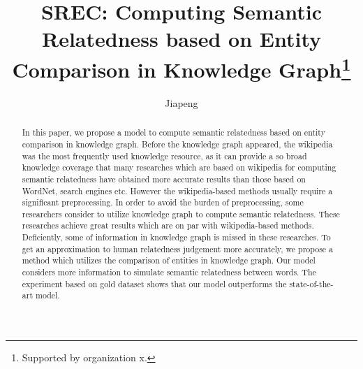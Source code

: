 \documentclass[runningheads]{llncs}
\begin{document}
  \title{SREC: Computing Semantic Relatedness based on Entity Comparison in Knowledge Graph\thanks{Supported by organization x.}}
  \author{Jiapeng }
  
  \maketitle              %
  \begin{abstract}
    In this paper, we propose a model to compute semantic relatedness based on entity comparison in knowledge graph.
    Before the knowledge graph appeared, the wikipedia was the most frequently used knowledge resource,
    as it can provide a so broad knowledge coverage that many researches which are based on wikipedia for computing semantic
    relatedness have obtained more accurate results than those based on WordNet, search engines etc.
    However the wikipedia-based methods usually require a significant preprocessing. 
    In order to avoid the burden of preprocessing, some researchers consider to utilize knowledge graph to compute semantic relatedness.
    These researches achieve great results which are on par with wikipedia-based methods. 
    Deficiently, some of information in knowledge graph is missed in these researches. 
    To get an approximation to human relatedness judgement more accurately, we propose a method which
    utilizes the comparison of entities in knowledge graph. Our model considers more information to simulate semantic relatedness between words.
    The experiment based on gold dataset shows that our model outperforms the state-of-the-art model.
  
  \end{abstract}
  
  
  
  
  

  
  
  
\end{document}
